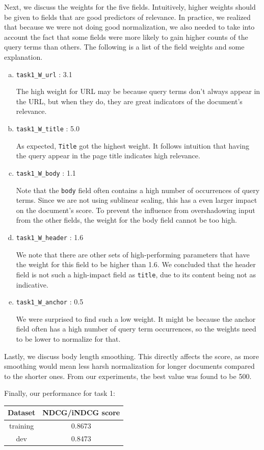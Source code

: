 \documentclass[10pt,twocolumn]{article}
\begin{document}
Next, we discuss the weights for the five fields. Intuitively, higher weights should be given to fields that are good predictors of relevance. In practice, we realized that because we were not doing good normalization, we also needed to take into account the fact that some fields were more likely to gain higher counts of the query terms than others. The following is a list of the field weights and some explanation.
\begin{enumerate}[(a)]
\item \texttt{task1\_W\_url} : 3.1

The high weight for URL may be because query terms don't always appear in the URL, but when they do, they are great indicators of the document's relevance.
\item \texttt{task1\_W\_title} : 5.0

As expected, \texttt{Title} got the highest weight. It follows intuition that having the query appear in the page title indicates high relevance. 
\item \texttt{task1\_W\_body} : 1.1

Note that the \texttt{body} field often contains a high number of occurrences of query terms. Since we are not using sublinear scaling, this has a even larger impact on the document's score. To prevent the influence from overshadowing input from the other fields, the weight for the body field cannot be too high.
\item \texttt{task1\_W\_header} : 1.6

We note that there are other sets of high-performing parameters that have the weight for this field to be higher than 1.6. We concluded that the header field is not such a high-impact field as \texttt{title}, due to its content being not as indicative.
\item \texttt{task1\_W\_anchor} : 0.5

We were surprised to find such a low weight. It might be because the anchor field often has a high number of query term occurrences, so the weights need to be lower to normalize for that.
\end{enumerate}

Lastly, we discuss body length smoothing. This directly affects the score, as more smoothing would mean less harsh normalization for longer documents compared to the shorter ones. From our experiments, the best value was found to be 500.

Finally, our performance for task 1:
\begin{table}[H]
\centering
\begin{tabular}{|c|c|}
\hline
Dataset & NDCG/iNDCG score \\\hline
training & 0.8673\\\hline
dev & 0.8473\\\hline
\end{tabular}
\end{table}
\end{document}

